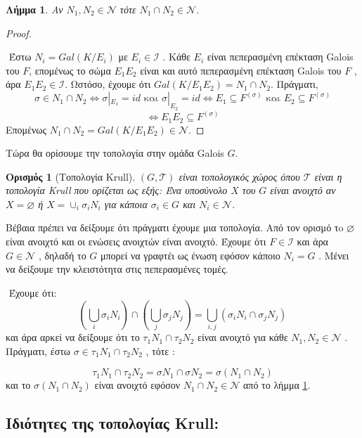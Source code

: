 \documentclass[oneside,a4paper]{article}
\newtheorem{lemma}{Λήμμα}
\newtheorem*{defn}{Ορισμός}
\newcommand {\tl}{\textlatin}
\begin{document}
\begin{lemma} \label{17.4} Αν $N_1 , N_2 \in \mathcal{N}$ τότε $N_1 \cap N_2 \in \mathcal{N}$.
\end{lemma}
\begin{proof} $ $


$ $\newline
Έστω $N_i = Gal(K/E_i)$ με $E_i \in \mathcal{I}$ . Κάθε $E_i$ είναι πεπερασμένη επέκταση \tl{Galois} του $F$, επομένως το σώμα $E_1 E_2$ είναι και αυτό πεπερασμένη επέκταση \tl{Galois} του $F$ , άρα $E_1 E_2 \in \mathcal{I}$. Ωστόσο, έχουμε ότι $Gal(K/E_1 E_2) = N_1 \cap N_2$. Πράγματι,
$$\sigma \in N_1 \cap N_2 \iff \sigma|_{E_1} = id \text{ και } \sigma|_{E_2}=id \iff E_1 \subseteq F^{(\sigma)} \text{ και } E_2 \subseteq F^{(\sigma)}$$
$$\iff E_1 E_2 \subseteq F^{(\sigma)}$$
Επομένως $N_1 \cap N_2 = Gal(K/E_1 E_2) \in \mathcal{N}$.
\end{proof}

\noindent Τώρα θα ορίσουμε την τοπολογία στην ομάδα \tl{Galois} $G$.

\begin{defn}[Τοπολογία \tl{Krull}] $(G,\mathcal{T})$ είναι τοπολογικός χώρος όπου $\mathcal{T}$ είναι η τοπολογία \tl{Krull} που ορίζεται ως εξής:
Ένα υποσύνολο $X$ του $G$ είναι ανοιχτό αν $X=\varnothing$ ή $X= \cup_i \sigma_i N_i$ για κάποια $\sigma_i \in G$ και $N_i \in \mathcal{N}$.
\end{defn}

\noindent Βέβαια πρέπει να δείξουμε ότι πράγματι έχουμε μια τοπολογία. Από τον ορισμό τo $\varnothing$ είναι ανοιχτό και οι ενώσεις ανοιχτών είναι ανοιχτό. Έχουμε ότι $F \in \mathcal{I}$ και άρα $G \in \mathcal{N}$ , δηλαδή το $G$ μπορεί να γραφτέι ως ένωση εφόσον κάποιο $N_i = G$ . Μένει να δείξουμε την κλειστότητα στις πεπερασμένες τομές.

$ $\newline
Έχουμε ότι: 
$$\left(\bigcup_i \sigma_i N_i \right) \cap \left(\bigcup_j \sigma_j N_j \right) = \bigcup_{i, j} \left( \sigma_i N_i \cap \sigma_j N_j \right)$$
και άρα αρκεί να δείξουμε ότι το $\tau_1 N_1 \cap \tau_2 N_2$ είναι ανοιχτό για κάθε $N_1, N_2 \in \mathcal{N}$ . Πράγματι, έστω $\sigma \in \tau_1 N_1 \cap \tau_2 N_2$ , τότε :

$$\tau_1 N_1 \cap \tau_2 N_2 = \sigma N_1 \cap \sigma N_2 = \sigma (N_1 \cap N_2)$$
και το $\sigma (N_1 \cap N_2)$ είναι ανοιχτό εφόσον $N_1 \cap N_2 \in \mathcal{N}$ από το λήμμα \ref{17.4}.

\subsection{Ιδιότητες της τοπολογίας \tl{Krull}:}
\end{document}

